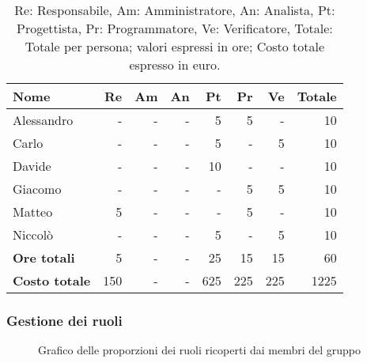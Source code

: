 \begin{table}[H]
	\centering
	\begin{tabular}{l|r|r|r|r|r|r|r}
		\textbf{Nome}         & \textbf{Re} & \textbf{Am} & \textbf{An} & \textbf{Pt} & \textbf{Pr} & \textbf{Ve} & \textbf{Totale} \\
		\hline
		Alessandro            & -           & -           & -           & 5           & 5           & -           & 10              \\
		Carlo                 & -           & -           & -           & 5           & -           & 5           & 10              \\
		Davide                & -           & -           & -           & 10          & -           & -           & 10              \\
		Giacomo               & -           & -           & -           & -           & 5           & 5           & 10              \\
		Matteo                & 5           & -           & -           & -           & 5           & -           & 10              \\
		Niccolò               & -           & -           & -           & 5           & -           & 5           & 10              \\
		\hline
		\textbf{Ore totali}   & 5           & -           & -           & 25          & 15          & 15          & 60              \\
		\textbf{Costo totale} & 150         & -           & -           & 625         & 225         & 225         & 1225
	\end{tabular}
	\caption{Re: Responsabile, Am: Amministratore, An: Analista, Pt: Progettista,
		Pr: Programmatore, Ve: Verificatore, Totale: Totale per persona; valori espressi in ore; Costo totale espresso in euro.}
\end{table}

\newpage
\subsubsection{Gestione dei ruoli}

\begin{figure}[h]
	\centering
	\caption{Grafico delle proporzioni dei ruoli ricoperti dai membri del gruppo}
\end{figure}

